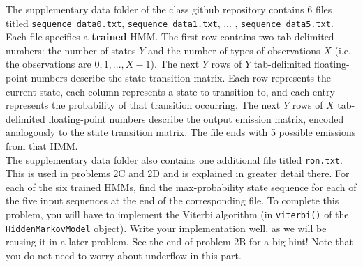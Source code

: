 The supplementary data folder of the class github repository contains 6 files titled \texttt{sequence_data0.txt}, \texttt{sequence_data1.txt}, ... , \texttt{sequence_data5.txt}. Each file specifies a \textbf{trained} HMM. The first row contains two tab-delimited numbers: the number of states $Y$ and the number of types of observations $X$ (i.e. the observations are $0, 1, . . . , X - 1$). The next $Y$ rows of $Y$ tab-delimited floating-point numbers describe the state transition matrix. Each row represents the current state, each column represents a state to transition to, and each entry represents the probability of that transition occurring. The next $Y$ rows of $X$ tab-delimited floating-point numbers describe the output emission matrix, encoded analogously to the state transition matrix. The file ends with 5 possible emissions from that HMM. \\

The supplementary data folder also contains one additional file titled \texttt{ron.txt}. This is used in problems 2C and 2D and is explained in greater detail there. 
\indent\problem[10] %
For each of the six trained HMMs, find the max-probability state sequence for each of the five input sequences at the end of the corresponding file. To complete this problem, you will have to implement the Viterbi algorithm (in \texttt{viterbi()} of the \texttt{HiddenMarkovModel} object). Write your implementation well, as we will be reusing it in a later problem. See the end of problem 2B for a big hint! Note that you do not need to worry about underflow in this part.

